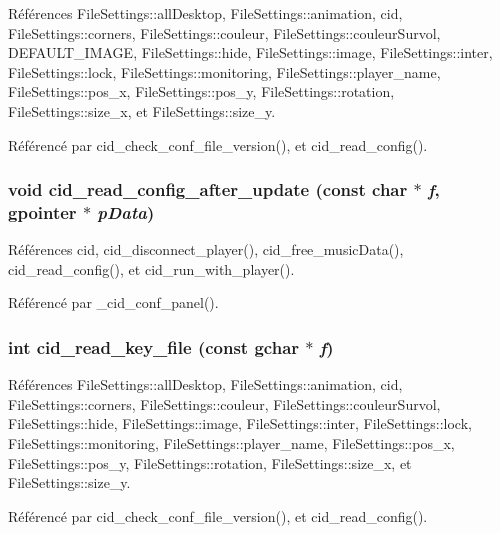 Références FileSettings::allDesktop, FileSettings::animation, cid, FileSettings::corners, FileSettings::couleur, FileSettings::couleurSurvol, DEFAULT\_\-IMAGE, FileSettings::hide, FileSettings::image, FileSettings::inter, FileSettings::lock, FileSettings::monitoring, FileSettings::player\_\-name, FileSettings::pos\_\-x, FileSettings::pos\_\-y, FileSettings::rotation, FileSettings::size\_\-x, et FileSettings::size\_\-y.

Référencé par cid\_\-check\_\-conf\_\-file\_\-version(), et cid\_\-read\_\-config().
\subsubsection{\setlength{\rightskip}{0pt plus 5cm}void cid\_\-read\_\-config\_\-after\_\-update (const char $\ast$ {\em f}, \/  gpointer $\ast$ {\em pData})}\label{cid-config_8c_f1fe3c86fa896a97e605559ae2b88b41}




Références cid, cid\_\-disconnect\_\-player(), cid\_\-free\_\-musicData(), cid\_\-read\_\-config(), et cid\_\-run\_\-with\_\-player().

Référencé par \_\-cid\_\-conf\_\-panel().
\subsubsection{\setlength{\rightskip}{0pt plus 5cm}int cid\_\-read\_\-key\_\-file (const gchar $\ast$ {\em f})}\label{cid-config_8c_0b6505cb73b9e5edfd90d08682687f7a}




Références FileSettings::allDesktop, FileSettings::animation, cid, FileSettings::corners, FileSettings::couleur, FileSettings::couleurSurvol, FileSettings::hide, FileSettings::image, FileSettings::inter, FileSettings::lock, FileSettings::monitoring, FileSettings::player\_\-name, FileSettings::pos\_\-x, FileSettings::pos\_\-y, FileSettings::rotation, FileSettings::size\_\-x, et FileSettings::size\_\-y.

Référencé par cid\_\-check\_\-conf\_\-file\_\-version(), et cid\_\-read\_\-config().
